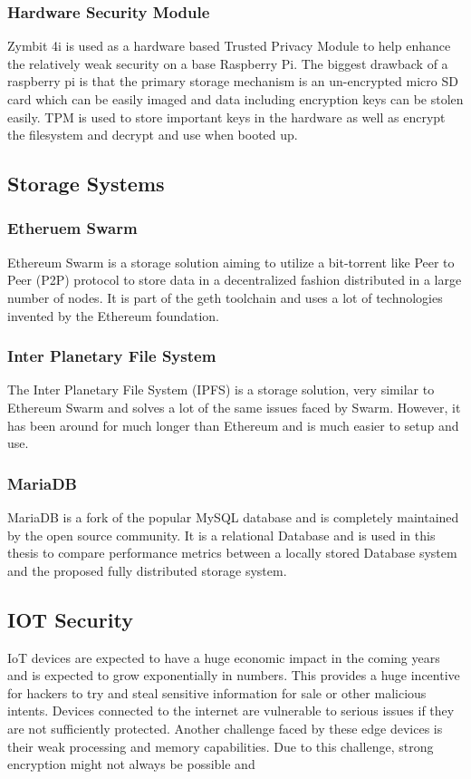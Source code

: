 \documentclass[11pt,openright]{report}
\begin{document}
\subsubsection{Hardware Security Module}
Zymbit 4i is used as a hardware based Trusted Privacy Module to help enhance the relatively weak security on a base Raspberry Pi. The biggest drawback of a raspberry pi is that the primary storage mechanism is an un-encrypted micro SD card which can be easily imaged and data including encryption keys can be stolen easily. TPM is used to store important keys in the hardware as well as encrypt the filesystem and decrypt and use when booted up.

\subsection{Storage Systems}
\subsubsection{Etheruem Swarm}
Ethereum Swarm is a storage solution aiming to utilize a bit-torrent like Peer to Peer (P2P) protocol to store data  in a decentralized fashion distributed in a large number of nodes. It is part of the geth toolchain and uses a lot of technologies invented by the Ethereum foundation. 

\subsubsection{Inter Planetary File System}
The Inter Planetary File System (IPFS) is a storage solution, very similar to Ethereum Swarm and solves a lot of the same issues faced by Swarm. However, it has been around for much longer than Ethereum and is much easier to setup and use.

\subsubsection{MariaDB}
MariaDB is a fork of the popular MySQL database and is completely maintained by the open source community. It is a relational Database and is used in this thesis to compare performance metrics between a locally stored Database system and the proposed fully distributed storage system.

\subsection{IOT Security}
IoT devices are expected to have a huge economic impact in the coming years and is expected to grow exponentially in numbers. This provides a huge incentive for hackers to try and steal sensitive information for sale or other malicious intents. Devices connected to the internet are vulnerable to serious issues if they are not sufficiently protected. Another challenge faced by these edge devices is their weak processing and memory capabilities. Due to this challenge, strong encryption might not always be possible and 
\end{document}
